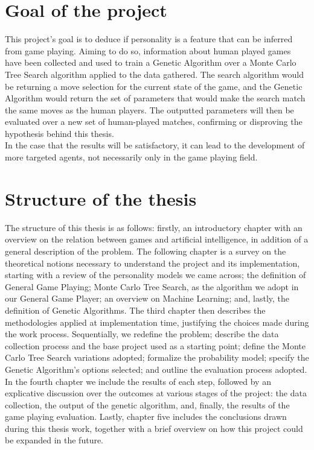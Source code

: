 \section{Goal of the project}
This project's goal is to deduce if personality is a feature that can be inferred from game playing. Aiming to do so, information about human played games have been collected and used to train a Genetic Algorithm over a Monte Carlo Tree Search algorithm applied to the data gathered. The search algorithm would be returning a move selection for the current state of the game, and the Genetic Algorithm would return the set of parameters that would make the search match the same moves as the human players. The outputted parameters will then be evaluated over a new set of human-played matches, confirming or disproving the hypothesis behind this thesis.\\
In the case that the results will be satisfactory, it can lead to the development of more targeted agents, not necessarily only in the game playing field.
\section{Structure of the thesis}
The structure of this thesis is as follows: firstly, an introductory chapter with an overview on the relation between games and artificial intelligence, in addition of a general description of the problem. The following chapter is a survey on the theoretical notions necessary to understand the project and its implementation, starting with a review of the personality models we came across; the definition of General Game Playing; Monte Carlo Tree Search, as the algorithm we adopt in our General Game Player; an overview on Machine Learning; and, lastly, the definition of Genetic Algorithms. The third chapter then describes the methodologies applied at implementation time, justifying the choices made during the work process. Sequentially, we redefine the problem; describe the data collection process and the base project used as a starting point; define the Monte Carlo Tree Search variations adopted; formalize the probability model; specify the Genetic Algorithm's options selected; and outline the evaluation process adopted. In the fourth chapter we include the results of each step, followed by an explicative discussion over the outcomes at various stages of the project: the data collection, the output of the genetic algorithm, and, finally, the results of the game playing evaluation. Lastly, chapter five includes the conclusions drawn during this thesis work, together with a brief overview on how this project could be expanded in the future.